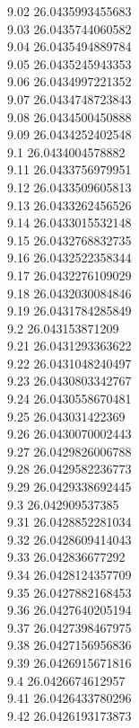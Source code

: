 {9.02	26.0435993455683\\
9.03	26.0435744060582\\
9.04	26.0435494889784\\
9.05	26.0435245943353\\
9.06	26.0434997221352\\
9.07	26.0434748723843\\
9.08	26.0434500450888\\
9.09	26.0434252402548\\
9.1	26.0434004578882\\
9.11	26.0433756979951\\
9.12	26.0433509605813\\
9.13	26.0433262456526\\
9.14	26.0433015532148\\
9.15	26.0432768832735\\
9.16	26.0432522358344\\
9.17	26.0432276109029\\
9.18	26.0432030084846\\
9.19	26.0431784285849\\
9.2	26.043153871209\\
9.21	26.0431293363622\\
9.22	26.0431048240497\\
9.23	26.0430803342767\\
9.24	26.0430558670481\\
9.25	26.043031422369\\
9.26	26.0430070002443\\
9.27	26.0429826006788\\
9.28	26.0429582236773\\
9.29	26.0429338692445\\
9.3	26.042909537385\\
9.31	26.0428852281034\\
9.32	26.0428609414043\\
9.33	26.042836677292\\
9.34	26.0428124357709\\
9.35	26.0427882168453\\
9.36	26.0427640205194\\
9.37	26.0427398467975\\
9.38	26.0427156956836\\
9.39	26.0426915671816\\
9.4	26.0426674612957\\
9.41	26.0426433780296\\
9.42	26.0426193173873\\
}
